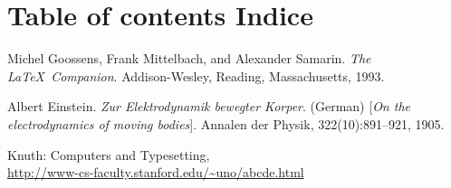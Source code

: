 \documentclass[a4paper]{article}
\begin{document}
\section*{\ifCDLeng Table of contents \fi  \ifCDLita Indice\fi}
\tableofcontents




\begin{thebibliography}{9}
Michel Goossens, Frank Mittelbach, and Alexander Samarin. 
\textit{The \LaTeX\ Companion}. 
Addison-Wesley, Reading, Massachusetts, 1993.

Albert Einstein. 
\textit{Zur Elektrodynamik bewegter Korper}. (German) 
[\textit{On the electrodynamics of moving bodies}]. 
Annalen der Physik, 322(10):891–921, 1905.

Knuth: Computers and Typesetting,
\\ \url{http://www-cs-faculty.stanford.edu/~uno/abcde.html}
\end{thebibliography}
\end{document}

